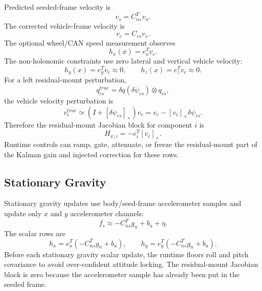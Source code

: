 \documentclass[11pt]{article}
\newcommand{\T}{^{T}}
\newcommand{\crossmat}[1]{\left[#1\right]_\times}
\newcommand{\dq}{\delta q}
\begin{document}
Predicted seeded-frame velocity is
\begin{equation}
  v_s=C_{ns}\T v_n .
\end{equation}
The corrected vehicle-frame velocity is
\begin{equation}
  v_c=C_{cs}v_s .
\end{equation}
The optional wheel/CAN speed measurement observes
\begin{equation}
  h_x(x)=e_x\T v_c .
\end{equation}
The non-holonomic constraints use zero lateral and vertical vehicle velocity:
\begin{equation}
  h_y(x)=e_y\T v_c\approx 0,\qquad
  h_z(x)=e_z\T v_c\approx 0 .
\end{equation}
For a left residual-mount perturbation,
\begin{equation}
  q_{cs}^{true}=\dq(\delta\psi_{cs})\otimes q_{cs},
\end{equation}
the vehicle velocity perturbation is
\begin{equation}
  v_c^{true}\simeq (I+\crossmat{\delta\psi_{cs}})v_c
  = v_c-\crossmat{v_c}\delta\psi_{cs}.
\end{equation}
Therefore the residual-mount Jacobian block for component \(i\) is
\begin{equation}
  H_{\psi,i}=-e_i\T\crossmat{v_c}.
\end{equation}
Runtime controls can ramp, gate, attenuate, or freeze the residual-mount part
of the Kalman gain and injected correction for these rows.

\subsection{Stationary Gravity}

Stationary gravity updates use body/seed-frame accelerometer samples and update
only \(x\) and \(y\) accelerometer channels:
\begin{equation}
  f_s \approx -C_{ns}\T g_n + b_a+\eta .
\end{equation}
The scalar rows are
\begin{equation}
  h_x=e_x\T(-C_{ns}\T g_n+b_a),\qquad
  h_y=e_y\T(-C_{ns}\T g_n+b_a).
\end{equation}
Before each stationary gravity scalar update, the runtime floors roll and pitch
covariance to avoid over-confident attitude locking. The residual-mount
Jacobian block is zero because the accelerometer sample has already been put in
the seeded frame.
\end{document}
